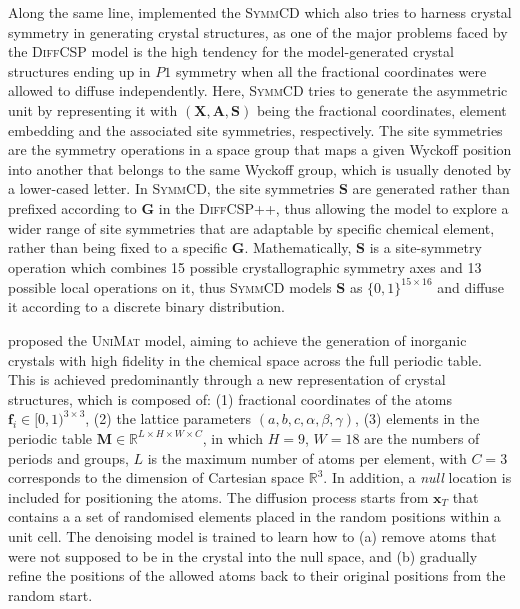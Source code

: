 Along the same line, \citet{levy2025symmcd} implemented the \textsc{SymmCD} which also tries to harness crystal symmetry in generating crystal structures, as one of the major problems faced by the \textsc{DiffCSP} model is the high tendency for the model-generated crystal structures ending up in $P1$ symmetry when all the fractional coordinates were allowed to diffuse independently. Here, \textsc{SymmCD} tries to generate the asymmetric unit by representing it with $(\bm{X},\bm{A},\bm{S})$ being the fractional coordinates, element embedding and the associated site symmetries, respectively.   The site symmetries are the symmetry operations in a space group that maps a given Wyckoff position into another that belongs to the same Wyckoff group, which is usually denoted by a lower-cased letter. In \textsc{SymmCD}, the site symmetries $\bm{S}$ are generated rather than prefixed according to $\bm{G}$ in the \textsc{DiffCSP}++, thus allowing the model to explore a wider range of site symmetries that are adaptable by specific chemical element, rather than being fixed to a specific $\bm{G}$. Mathematically, $\bm{S}$ is a site-symmetry operation which combines 15 possible crystallographic symmetry axes and 13 possible local operations on it, thus \textsc{SymmCD} models $\bm{S}$ as $\{0,1\}^{15\times 16}$ and diffuse it according to a discrete binary distribution.


\citet{yang2024scalable} proposed the \textsc{UniMat} model, aiming to achieve the generation of inorganic crystals with high fidelity in the chemical space across the full periodic table. This is achieved predominantly through a new representation of crystal structures, which is composed of: (1) fractional coordinates of the atoms $\bm{f}_i\in[0,1)^{3\times3}$, (2) the lattice parameters $(a,b,c,\alpha,\beta,\gamma)$, (3) elements in the periodic table $\bm{M}\in\mathbb{R}^{L\times H\times W\times C}$, in which $H=9$, $W=18$ are the numbers of periods and groups, $L$ is the maximum number of atoms per element, with $C=3$ corresponds to the dimension of Cartesian space $\mathbb{R}^3$. In addition, a \emph{null} location is included for positioning the atoms. The diffusion process starts from $\bm{x}_T$ that contains a a set of randomised elements placed in the random positions within a unit cell. The denoising model is trained to learn how to (a) remove atoms that were not supposed to be in the crystal into the null space, and (b) gradually refine the positions of the allowed atoms back to their original positions from the random start. 


